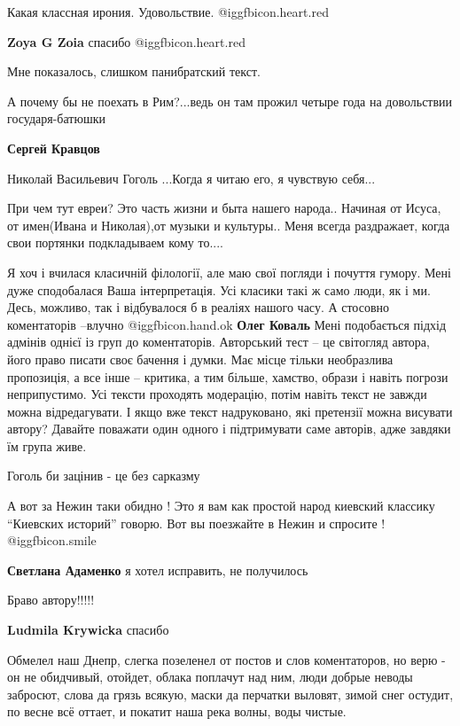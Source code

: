 \begin{itemize}
Какая классная ирония. Удовольствие. @igg{fbicon.heart.red}

\textbf{Zoya G Zoia} спасибо @igg{fbicon.heart.red}

Мне показалось, слишком панибратский текст.

А почему бы не поехать в Рим?...ведь он там прожил четыре года на довольствии
государя-батюшки

\textbf{Сергей Кравцов} 

Николай Васильевич Гоголь ...Когда я читаю его, я чувствую себя...

При чем тут евреи? Это часть жизни и быта нашего народа.. Начиная от Исуса, от
имен(Ивана и Николая),от музыки и культуры.. Меня всегда раздражает, когда свои
портянки подкладываем кому то....


\obeycr
Я хоч і вчилася класичній філології, але маю свої погляди і почуття гумору.
Мені дуже сподобалася Ваша інтерпретація.
Усі класики такі ж само люди, як і ми.
Десь, можливо, так і відбувалося б в реаліях нашого часу.
А стосовно коментаторів –влучно @igg{fbicon.hand.ok} 
\textbf{Олег Коваль}
Мені подобається підхід адмінів однієї із груп до коментаторів.
Авторський тест – це світогляд автора, його право писати своє бачення і думки.
Має місце тільки необразлива пропозиція, а все інше – критика, а тим більше, хамство, образи і навіть погрози неприпустимо.
Усі тексти проходять модерацію, потім навіть текст не завжди можна відредагувати.
І якщо вже текст надруковано, які претензії можна висувати автору?
Давайте поважати один одного і підтримувати саме авторів, адже завдяки їм група живе.
\restorecr

Гоголь би зацінив - це без сарказму


А вот за Нежин таки обидно ! Это я вам как простой народ киевский классику
\enquote{Киевских историй} говорю.  Вот вы поезжайте в Нежин и спросите !  @igg{fbicon.smile} 

\textbf{Светлана Адаменко} я хотел исправить, не получилось

Браво автору!!!!!

\textbf{Ludmila Krywicka} спасибо


Обмелел наш Днепр, слегка позеленел от постов и слов коментаторов, но верю - он
не обидчивый, отойдет, облака поплачут над ним, люди добрые неводы забросют,
слова да грязь всякую, маски да перчатки выловят, зимой снег остудит, по весне
всё оттает, и покатит наша река волны, воды чистые.


\end{itemize}
